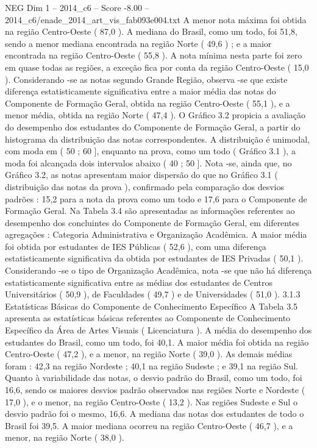 \begin{textsample}{NEG Dim 1 – 2014\_c6 – Score -8.00 – 2014\_c6/enade\_2014\_art\_vis\_fab093e004.txt}
A menor nota máxima foi obtida na região Centro-Oeste ( 87,0 ).
A mediana do Brasil, como um todo, foi 51,8, sendo a menor mediana encontrada na região Norte ( 49,6 ) ; e a maior encontrada na região Centro-Oeste ( 55,8 ).
A nota mínima nesta parte foi zero em quase todas as regiões, a exceção fica por conta da região Centro-Oeste ( 15,0 ).
Considerando -se as notas segundo Grande Região, observa -se que existe diferença estatisticamente significativa entre a maior média das notas do Componente de Formação Geral, obtida na região Centro-Oeste ( 55,1 ), e a menor média, obtida na região Norte ( 47,4 ).
O Gráfico 3.2 propicia a avaliação do desempenho dos estudantes do Componente de Formação Geral, a partir do histograma da distribuição das notas correspondentes.
A distribuição é unimodal, com moda em ( 50 ; 60 ], enquanto na prova, como um todo ( Gráfico 3.1 ), a moda foi alcançada dois intervalos abaixo ( 40 ; 50 ].
Nota -se, ainda que, no Gráfico 3.2, as notas apresentam maior dispersão do que no Gráfico 3.1 ( distribuição das notas da prova ), confirmado pela comparação dos desvios padrões : 15,2 para a nota da prova como um todo e 17,6 para o Componente de Formação Geral.
Na Tabela 3.4 são apresentadas as informações referentes ao desempenho dos concluintes do Componente de Formação Geral, em diferentes agregações : Categoria Administrativa e Organização Acadêmica.
A maior média foi obtida por estudantes de IES Públicas ( 52,6 ), com uma diferença estatisticamente significativa da obtida por estudantes de IES Privadas ( 50,1 ).
Considerando -se o tipo de Organização Acadêmica, nota -se que não há diferença estatisticamente significativa entre as médias dos estudantes de Centros Universitários ( 50,9 ), de Faculdades ( 49,7 ) e de Universidades ( 51,0 ). 3.1.3 Estatísticas Básicas do Componente de Conhecimento Específico A Tabela 3.5 apresenta as estatísticas básicas referentes ao Componente de Conhecimento Específico da Área de Artes Visuais ( Licenciatura ).
A média do desempenho dos estudantes do Brasil, como um todo, foi 40,1.
A maior média foi obtida na região Centro-Oeste ( 47,2 ), e a menor, na região Norte ( 39,0 ).
As demais médias foram : 42,3 na região Nordeste ; 40,1 na região Sudeste ; e 39,1 na região Sul.
Quanto à variabilidade das notas, o desvio padrão do Brasil, como um todo, foi 16,6, sendo os maiores desvios padrão observados nas regiões Norte e Nordeste ( 17,0 ), e o menor, na região Centro-Oeste ( 13,2 ).
Nas regiões Sudeste e Sul o desvio padrão foi o mesmo, 16,6.
A mediana das notas dos estudantes de todo o Brasil foi 39,5.
A maior mediana ocorreu na região Centro-Oeste ( 46,7 ), e a menor, na região Norte ( 38,0 ).

\end{textsample}

